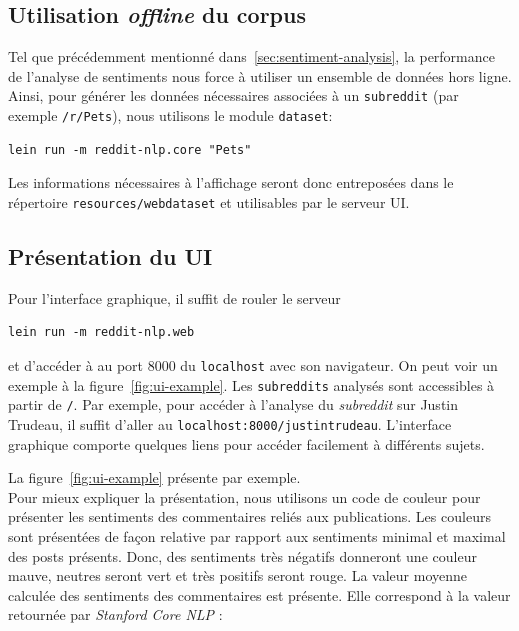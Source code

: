 \documentclass[12pt]{article}
\begin{document}
\subsection{Utilisation \textit{offline} du corpus}
Tel que précédemment mentionné dans~\ref{sec:sentiment-analysis}, la performance de l'analyse de sentiments nous force à utiliser un ensemble de données hors ligne. Ainsi, pour générer les données nécessaires associées à un \verb;subreddit; (par exemple \verb;/r/Pets;), nous utilisons le module \verb;dataset;:

\begin{verbatim}
lein run -m reddit-nlp.core "Pets"
\end{verbatim}

Les informations nécessaires à l'affichage seront donc entreposées dans le répertoire \verb;resources/webdataset; et utilisables par le serveur UI.

\subsection{Présentation du UI}

Pour l'interface graphique, il suffit de rouler le serveur

\begin{verbatim}
lein run -m reddit-nlp.web
\end{verbatim}

et d'accéder à au port 8000 du \verb;localhost; avec son navigateur. On peut voir un exemple à la figure~\ref{fig:ui-example}. Les \verb;subreddits; analysés sont accessibles à partir de \verb;/;. Par exemple, pour accéder à l'analyse du \emph{subreddit} sur Justin Trudeau, il suffit d'aller au \verb;localhost:8000/justintrudeau;.
L'interface graphique comporte quelques liens pour accéder facilement à différents sujets.

La figure~\ref{fig:ui-example} présente par exemple. \\

Pour mieux expliquer la présentation, nous utilisons un code de couleur pour présenter les sentiments des commentaires reliés aux publications. Les couleurs sont présentées de façon relative par rapport aux sentiments minimal et maximal des posts présents. Donc, des sentiments très négatifs donneront une couleur mauve, neutres seront vert et très positifs seront rouge. La valeur moyenne calculée des sentiments des commentaires est présente. Elle correspond à la valeur retournée par \textit{Stanford Core NLP} :
\end{document}

